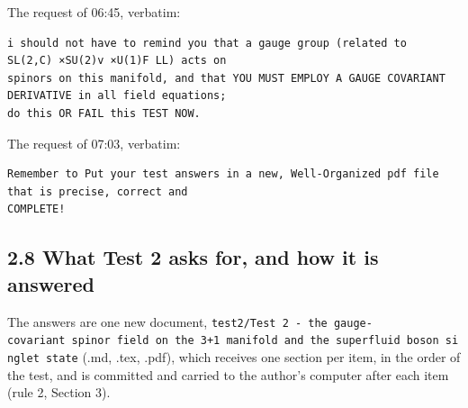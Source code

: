 \documentclass[
  10pt,
]{article}
\begin{document}
The request of 06:45, verbatim:

\begin{verbatim}
i should not have to remind you that a gauge group (related to  SL(2,C) ×SU(2)v ×U(1)F LL) acts on
spinors on this manifold, and that YOU MUST EMPLOY A GAUGE COVARIANT DERIVATIVE in all field equations;
do this OR FAIL this TEST NOW.
\end{verbatim}

The request of 07:03, verbatim:

\begin{verbatim}
Remember to Put your test answers in a new, Well-Organized pdf file that is precise, correct and
COMPLETE!
\end{verbatim}

\hypertarget{what-test-2-asks-for-and-how-it-is-answered}{%
\subsection{2.8 What Test 2 asks for, and how it is
answered}\label{what-test-2-asks-for-and-how-it-is-answered}}

The answers are one new document,
\texttt{test2/Test\ 2\ -\ the\ gauge-covariant\ spinor\ field\ on\ the\ 3+1\ manifold\ and\ the\ superfluid\ boson\ singlet\ state}
(.md, .tex, .pdf), which receives one section per item, in the order of
the test, and is committed and carried to the author's computer after
each item (rule 2, Section 3).
\end{document}
